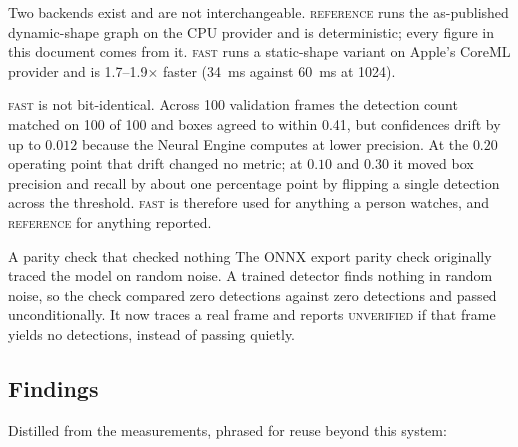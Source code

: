Two backends exist and are not interchangeable. \textsc{reference} runs the
as-published dynamic-shape graph on the CPU provider and is deterministic;
every figure in this document comes from it. \textsc{fast} runs a static-shape
variant on Apple's CoreML provider and is 1.7--1.9$\times$ faster
(\SI{34}{\milli\second} against \SI{60}{\milli\second} at \SI{1024}{\pixel}).

\textsc{fast} is not bit-identical. Across 100 validation frames the detection
count matched on 100 of 100 and boxes agreed to within \SI{0.41}{\pixel}, but
confidences drift by up to $0.012$ because the Neural Engine computes at lower
precision. At the $0.20$ operating point that drift changed no metric; at
$0.10$ and $0.30$ it moved box precision and recall by about one percentage
point by flipping a single detection across the threshold. \textsc{fast} is
therefore used for anything a person watches, and \textsc{reference} for
anything reported.

\begin{recorded}{A parity check that checked nothing}
The ONNX export parity check originally traced the model on random noise. A
trained detector finds nothing in random noise, so the check compared zero
detections against zero detections and passed unconditionally. It now traces a
real frame and reports \textsc{unverified} if that frame yields no detections,
instead of passing quietly.
\end{recorded}

\subsection{Findings}
\label{sec:findings}

Distilled from the measurements, phrased for reuse beyond this system:

